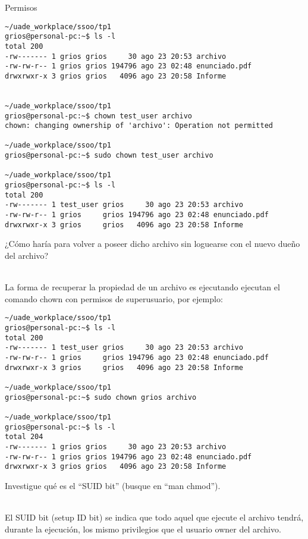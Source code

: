 \begin{section}{Permisos}
\begin{lstlisting}[style=Ubuntu]
~/uade_workplace/ssoo/tp1
grios@personal-pc:~$ ls -l                     
total 200
-rw------- 1 grios grios     30 ago 23 20:53 archivo
-rw-rw-r-- 1 grios grios 194796 ago 23 02:48 enunciado.pdf
drwxrwxr-x 3 grios grios   4096 ago 23 20:58 Informe


~/uade_workplace/ssoo/tp1
grios@personal-pc:~$ chown test_user archivo
chown: changing ownership of 'archivo': Operation not permitted

~/uade_workplace/ssoo/tp1
grios@personal-pc:~$ sudo chown test_user archivo

~/uade_workplace/ssoo/tp1
grios@personal-pc:~$ ls -l
total 200
-rw------- 1 test_user grios     30 ago 23 20:53 archivo
-rw-rw-r-- 1 grios     grios 194796 ago 23 02:48 enunciado.pdf
drwxrwxr-x 3 grios     grios   4096 ago 23 20:58 Informe

\end{lstlisting}

\begin{quoting}
¿Cómo haría para volver a poseer dicho archivo sin loguearse con el nuevo dueño del archivo?
\end{quoting}
\\
La forma de recuperar la propiedad de un archivo es ejecutando ejecutan el comando chown con permisos de superusuario, por ejemplo:

\begin{lstlisting}[style=Ubuntu]
~/uade_workplace/ssoo/tp1
grios@personal-pc:~$ ls -l
total 200
-rw------- 1 test_user grios     30 ago 23 20:53 archivo
-rw-rw-r-- 1 grios     grios 194796 ago 23 02:48 enunciado.pdf
drwxrwxr-x 3 grios     grios   4096 ago 23 20:58 Informe

~/uade_workplace/ssoo/tp1
grios@personal-pc:~$ sudo chown grios archivo

~/uade_workplace/ssoo/tp1
grios@personal-pc:~$ ls -l
total 204
-rw------- 1 grios grios     30 ago 23 20:53 archivo
-rw-rw-r-- 1 grios grios 194796 ago 23 02:48 enunciado.pdf
drwxrwxr-x 3 grios grios   4096 ago 23 20:58 Informe

\end{lstlisting}

\begin{quoting}
Investigue qué es el “SUID bit” (busque en “man chmod”).
\end{quoting}\\
El SUID bit (setup ID bit) se indica que todo aquel que ejecute el archivo tendrá, durante la ejecución, los mismo privilegios que el usuario owner del archivo.\\


\end{section}
